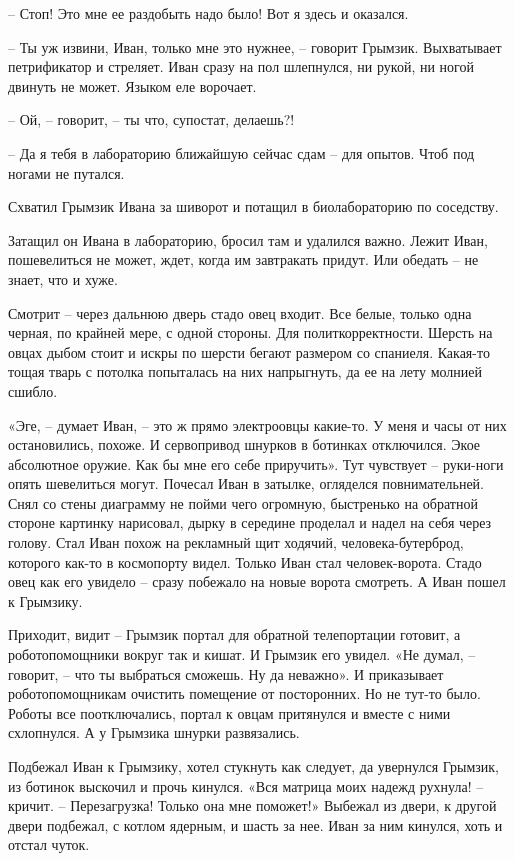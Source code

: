 \documentclass[ebook,oneside,final,openright]{memoir}
\begin{document}
– Стоп! Это мне ее раздобыть надо было! Вот я здесь и оказался.\par
– Ты уж извини, Иван, только мне это нужнее, – говорит Грымзик. Выхватывает петрификатор и стреляет. Иван сразу на пол шлепнулся, ни рукой, ни ногой двинуть не может. Языком еле ворочает.\par
– Ой, – говорит, – ты что, супостат, делаешь?!\par
– Да я тебя в лабораторию ближайшую сейчас сдам – для опытов. Чтоб под ногами не путался.\par
Схватил Грымзик Ивана за шиворот и потащил в биолабораторию по соседству.\par
\par
Затащил он Ивана в лабораторию, бросил там и удалился важно. Лежит Иван, пошевелиться не может, ждет, когда им завтракать придут. Или обедать – не знает, что и хуже. \par
Смотрит – через дальнюю дверь стадо овец входит. Все белые, только одна черная, по крайней мере, с одной стороны. Для политкорректности. Шерсть на овцах дыбом стоит и искры по шерсти бегают размером со спаниеля. Какая-то тощая тварь с потолка попыталась на них напрыгнуть, да ее на лету молнией сшибло.\par
\par
«Эге, – думает Иван, – это ж прямо электроовцы какие-то. У меня и часы от них остановились, похоже. И сервопривод шнурков в ботинках отключился. Экое абсолютное оружие. Как бы мне его себе приручить». Тут чувствует – руки-ноги опять шевелиться могут. Почесал Иван в затылке, огляделся повнимательней. Снял со стены диаграмму не пойми чего огромную, быстренько на обратной стороне картинку нарисовал, дырку в середине проделал и надел на себя через голову. Стал Иван похож на рекламный щит ходячий, человека-бутерброд, которого как-то в космопорту видел. Только Иван стал человек-ворота. Стадо овец как его увидело – сразу побежало на новые ворота смотреть. А Иван пошел к Грымзику.\par
\par
Приходит, видит – Грымзик портал для обратной телепортации готовит, а роботопомощники вокруг так и кишат. И Грымзик его увидел. «Не думал, – говорит, – что ты выбраться сможешь. Ну да неважно». И приказывает роботопомощникам очистить помещение от посторонних. Но не тут-то было. Роботы все поотключались, портал к овцам притянулся и вместе с ними схлопнулся. А у Грымзика шнурки развязались.\par
\par
Подбежал Иван к Грымзику, хотел стукнуть как следует, да увернулся Грымзик, из ботинок выскочил и прочь кинулся. «Вся матрица моих надежд рухнула! – кричит. – Перезагрузка! Только она мне поможет!» Выбежал из двери, к другой двери подбежал, с котлом ядерным, и шасть за нее. Иван за ним кинулся, хоть и отстал чуток.\par
\end{document}
